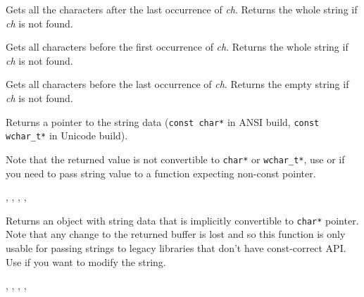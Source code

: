 Gets all the characters after the last occurrence of {\it ch}.
Returns the whole string if {\it ch} is not found.


\label{wxstringbeforefirst}


Gets all characters before the first occurrence of {\it ch}.
Returns the whole string if {\it ch} is not found.


\label{wxstringbeforelast}


Gets all characters before the last occurrence of {\it ch}.
Returns the empty string if {\it ch} is not found.


\label{wxstringcstr}


Returns a pointer to the string data ({\tt const char*} in ANSI build,
{\tt const wchar\_t*} in Unicode build).

Note that the returned value is not convertible to {\tt char*} or
{\tt wchar\_t*}, use  or
 if you need to pass string value
to a function expecting non-const pointer.


, ,
, ,

\label{wxstringcharstr}


Returns an object with string data that is implicitly convertible to
{\tt char*} pointer. Note that any change to the returned buffer is lost and so
this function is only usable for passing strings to legacy libraries that
don't have const-correct API. Use  if
you want to modify the string.


, ,
, ,


